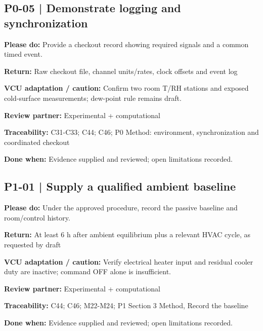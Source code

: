 \documentclass[11pt]{article}
\begin{document}
\begin{minipage}{\textwidth}\small\setlength{\parskip}{2pt}
\subsection*{P0-05 | Demonstrate logging and synchronization}
\textbf{Please do:} Provide a checkout record showing required signals and a common timed event.\par
\textbf{Return:} Raw checkout file, channel units/rates, clock offsets and event log\par
\textbf{VCU adaptation / caution:} Confirm two room T/RH stations and exposed cold-surface measurements; dew-point rule remains draft.\par
\textbf{Review partner:} Experimental + computational\par
\textbf{Traceability:} C31-C33; C44; C46; P0 Method: environment, synchronization and coordinated checkout\par
\textbf{Done when:} Evidence supplied and reviewed; open limitations recorded.\par
\end{minipage}\par\vspace{8pt}
\begin{minipage}{\textwidth}\small\setlength{\parskip}{2pt}
\subsection*{P1-01 | Supply a qualified ambient baseline}
\textbf{Please do:} Under the approved procedure, record the passive baseline and room/control history.\par
\textbf{Return:} At least 6 h after ambient equilibrium plus a relevant HVAC cycle, as requested by draft\par
\textbf{VCU adaptation / caution:} Verify electrical heater input and residual cooler duty are inactive; command OFF alone is insufficient.\par
\textbf{Review partner:} Experimental + computational\par
\textbf{Traceability:} C44; C46; M22-M24; P1 Section 3 Method, Record the baseline\par
\textbf{Done when:} Evidence supplied and reviewed; open limitations recorded.\par
\end{minipage}\par\vspace{8pt}
\end{document}
